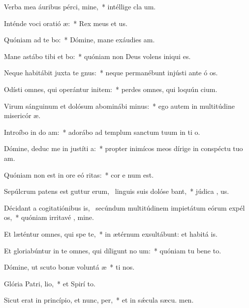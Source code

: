 \item Verba mea áuribus pérci, mine,~* intéllige cla um.
\item Inténde voci oratió æ:~* Rex meus et  us.
\item Quóniam ad te bo:~* Dómine, mane exáudies  am.
\item Mane astábo tibi et bo:~* quóniam non Deus volens iniqui  es.
\item Neque habitábit juxta te gnus:~* neque permanébunt injústi ante ó os.
\item Odísti omnes, qui operántur initem:~* perdes omnes, qui loquún cium.
\item Virum sánguinum et dolósum abominábi minus:~* ego autem in multitúdine misericór æ.
\item Introíbo in do am:~* adorábo ad templum sanctum tuum in ti o.
\item Dómine, deduc me in justíti a:~* propter inimícos meos dírige in conspéctu tuo  am.
\item Quóniam non est in ore eó ritas:~* cor e num est.
\item Sepúlcrum patens est guttur erum,~\pscross{} linguis suis dolóse bant,~* júdica , us.
\item Décidant a cogitatiónibus is,~\pscross{} secúndum multitúdinem impietátum eórum expél os,~* quóniam irritavé , mine.
\item Et læténtur omnes, qui spe  te,~* in ætérnum exsultábunt: et habitá  is.
\item Et gloriabúntur in te omnes, qui díligunt no um:~* quóniam tu bene to.
\item Dómine, ut scuto bonæ voluntá æ~* ti nos.
\item Glória Patri,  lio,~* et Spirí to.
\item Sicut erat in princípio, et nunc,  per,~* et in sǽcula sæcu. men.
